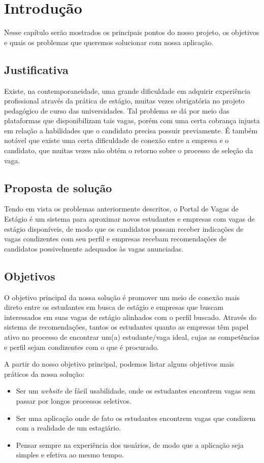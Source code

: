 
\chapter[Introdução]{Introdução}

Nesse capítulo serão mostrados os principais pontos do nosso projeto, os objetivos e quais os problemas que queremos solucionar com nossa aplicação.

\section{Justificativa}
Existe, na contemporaneidade, uma grande dificuldade em adquirir experiência profissional através da prática de estágio, muitas vezes obrigatória no projeto pedagógico de curso das universidades. Tal problema se dá por meio das plataformas que disponibilizam tais vagas, porém com uma certa cobrança injusta em relação a habilidades que o candidato precisa possuir previamente. É também notável que existe uma certa dificuldade de conexão entre a empresa e o candidato, que muitas vezes não obtém o retorno sobre o processo de seleção da vaga.

\section{Proposta de solução}
Tendo em vista os problemas anteriormente descritos, o Portal de Vagas de Estágio é um sistema para aproximar novos estudantes e empresas com vagas de estágio disponíveis, de modo que os candidatos possam receber indicações de vagas condizentes com seu perfil e empresas recebam recomendações de candidatos possivelmente adequados às vagas anunciadas.

\section{Objetivos}
O objetivo principal da nossa solução é promover um meio de conexão mais direto entre os estudantes em busca de estágio e empresas que buscam interessados em suas vagas de estágio alinhados com o perfil buscado. Através do sistema de recomendações, tantos os estudantes quanto as empresas têm papel ativo no processo de encontrar um(a) estudante/vaga ideal, cujas as competências e perfil sejam condizentes com o que é procurado.

A partir do nosso objetivo principal, podemos listar alguns objetivos mais práticos da nossa solução:

\begin{itemize}
	\item Ser um \emph{website} de fácil usabilidade, onde os estudantes encontrem vagas sem passar por longos processos seletivos.
	\item Ser uma aplicação onde de fato os estudantes encontrem vagas que condizem com a realidade de um estagiário.
	\item Pensar sempre na experiência dos usuários, de modo que a aplicação seja simples e efetiva ao mesmo tempo.
\end{itemize}
	
